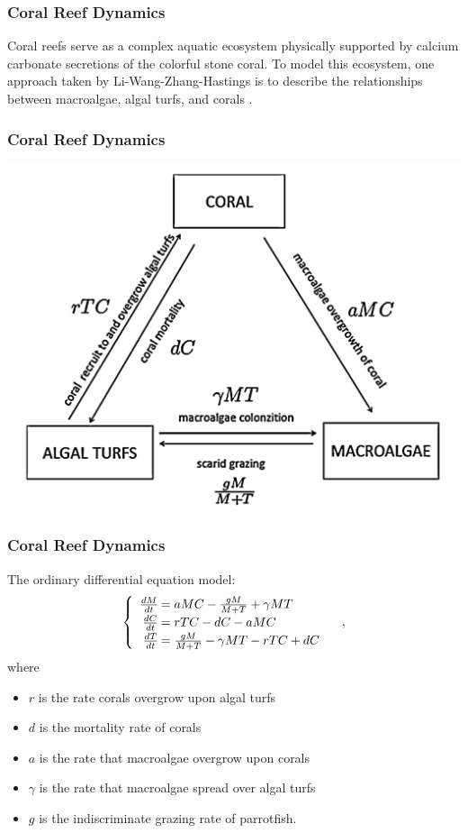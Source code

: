 

\begin{frame}
\frametitle{Coral Reef Dynamics}
\hspace{1.5em}Coral reefs serve as a complex aquatic ecosystem physically supported by calcium carbonate secretions of the colorful stone coral. To model this ecosystem, one approach taken by Li-Wang-Zhang-Hastings is to describe the relationships between macroalgae, algal turfs, and corals \cite{Hastings}.
\end{frame}

\begin{frame}
\frametitle{Coral Reef Dynamics}
\includegraphics[scale=.35]{./coral-reef-triangle.png}
\end{frame}

\begin{frame}\frametitle{Coral Reef Dynamics}
The ordinary differential equation model:
$$\begin{cases}\begin{array}{rl}
\frac{dM}{dt}\hspace{-.8em}&=aMC - \frac{gM}{M+T}+\gamma M T\\
\frac{dC}{dt}\hspace{-.8em}&=rTC - dC - aMC\\
\frac{dT}{dt}\hspace{-.8em}&=\frac{gM}{M + T} - \gamma MT - rTC + dC
\end{array}\end{cases},$$ where \begin{itemize}\itemsep0pt
\item $r$ is the rate corals overgrow upon algal turfs\\
\item $d$ is the mortality rate of corals\\
\item $a$ is the rate that macroalgae overgrow upon corals\\
\item $\gamma$ is the rate that macroalgae spread over algal turfs\\
\item $g$ is the indiscriminate grazing rate of parrotfish.
\end{itemize}
\end{frame}

